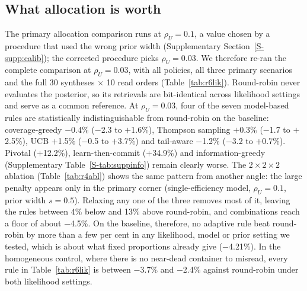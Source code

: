 \documentclass[conference,onecolumn,11pt]{IEEEtran}
\begin{document}
\subsection{What allocation is worth}\label{sec:res-alloc}\label{sec:res-lik}


The primary allocation comparison runs at $\rho_U{=}0.1$, a value chosen by a procedure that used the
wrong prior width (Supplementary Section~\ref{S-supp:calib}); the corrected procedure picks
$\rho_U{=}0.03$.  We therefore re-ran the complete comparison at $\rho_U{=}0.03$, with all policies, all
three primary scenarios and the full 30 syntheses $\times$ 10 read orders (Table~\ref{tab:r6lik}).
Round-robin never evaluates the posterior, so its retrievals are bit-identical across likelihood
settings and serve as a common reference.  At $\rho_U{=}0.03$, four of the seven model-based rules are
statistically indistinguishable from round-robin on the baseline: coverage-greedy $-$0.4\% ($-$2.3 to $+$1.6\%),
Thompson sampling $+$0.3\% ($-$1.7 to $+$2.5\%), UCB $+$1.5\% ($-$0.5 to $+$3.7\%) and tail-aware $-$1.2\% ($-$3.2 to $+$0.7\%).  Pivotal ($+$12.2\%),
learn-then-commit ($+$34.9\%) and information-greedy (Supplementary Table~\ref{S-tab:suppinfo})
remain clearly worse.  The $2\times2\times2$ ablation (Table~\ref{tab:r4abl}) shows the same pattern from
another angle: the large penalty appears only in the primary corner (single-efficiency model,
$\rho_U{=}0.1$, prior width $s{=}0.5$).  Relaxing any one of the three removes most of it, leaving the
rules between 4\% below and 13\% above round-robin, and combinations reach a floor of about $-$4.5\%.  On
the baseline, therefore, no adaptive rule beat round-robin by more than a few per cent in any likelihood,
model or prior setting we tested, which is about what fixed proportions already give ($-$4.21\%).  In the
homogeneous control, where there is no near-dead container to misread, every rule in
Table~\ref{tab:r6lik} is between $-$3.7\% and $-$2.4\% against round-robin under both likelihood settings.
\end{document}
